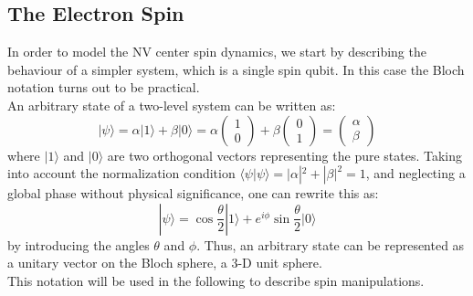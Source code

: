 \documentclass[12pt,a4paper]{article}
\begin{document}
\subsection{The Electron Spin}
In order to model the NV center spin dynamics, we start by describing the behaviour of a simpler system, which is a single spin qubit. In this case the Bloch notation turns out to be practical.\\
An arbitrary state of a two-level system can be written as:
\begin{equation}\label{ab}
|\psi\rangle =\alpha |1\rangle +\beta |0\rangle =\alpha \left(\begin{matrix}
1\\0
\end{matrix}\right) + \beta \left(\begin{matrix}
0\\1
\end{matrix}\right)=\left(\begin{matrix}
\alpha \\\beta
\end{matrix}\right)
\end{equation}
where $|1\rangle$ and $|0\rangle$ are two orthogonal vectors representing the pure states.
Taking into account the normalization condition $\langle\psi |\psi\rangle=|\alpha |^2+|\beta |^2=1$, and neglecting a global phase without physical significance, one can rewrite this as:
\begin{equation}\label{bloch}
|\psi \rangle =\cos\frac{\theta}{2}|1\rangle +e^{i\phi}\sin\frac{\theta}{2}|0\rangle
\end{equation}
by introducing the angles $\theta$ and $\phi$. Thus, an arbitrary state can be represented as a unitary vector on the Bloch sphere, a 3-D unit sphere.\\
This notation will be used in the following to describe spin manipulations.
\end{document}
